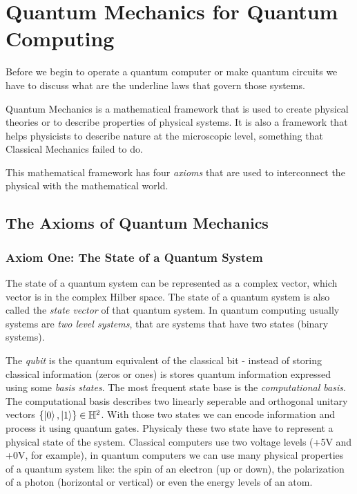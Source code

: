 \section{Quantum Mechanics for Quantum Computing}

Before we begin to operate a quantum computer or make quantum circuits we have to discuss
what are the underline laws that govern those systems.

Quantum Mechanics is a mathematical framework that is used to create physical theories or
to describe properties of physical systems. It is also a framework that helps physicists
to describe nature at the microscopic level, something that Classical Mechanics failed to do.

This mathematical framework has four \textit{axioms} that are used to interconnect the physical
with the mathematical world.

\subsection{The Axioms of Quantum Mechanics}
\subsubsection{Axiom One: The State of a Quantum System}

The state of a quantum system can be represented as a complex vector, which vector is in the
complex Hilber space. The state of a quantum system is also called the \textit{state vector} of
that quantum system. In quantum computing usually systems are \textit{two level systems}, that are systems
that have two states (binary systems).

The \textit{qubit} is the quantum equivalent of the classical bit - instead of storing classical information
(zeros or ones) is stores quantum information expressed using some \textit{basis states}. The most frequent
state base is the \textit{computational basis}. The computational basis describes two linearly seperable
and orthogonal unitary vectors $\{\ket{0},\ket{1}\}\in\mathbb{H}^2$. With those two states we can encode
information and process it using quantum gates. Physicaly these two state have to represent
a physical state of the system. Classical computers use two voltage levels (+5V and +0V, for example), in 
quantum computers we can use many physical properties of a quantum system like: the spin of an
electron (up or down), the polarization of a photon (horizontal or vertical) or even the energy levels of an atom.

